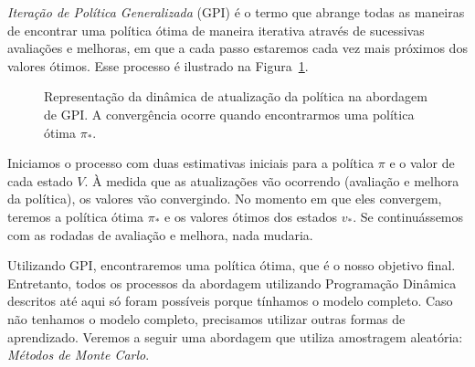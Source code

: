 \documentclass{article}
\begin{document}
        \emph{Iteração de Política Generalizada} (GPI) é o termo que abrange todas as maneiras de encontrar uma política ótima de maneira iterativa através de sucessivas avaliações e melhoras, em que a cada passo estaremos cada vez mais próximos dos valores ótimos. Esse processo é ilustrado na Figura~\ref{diag:generalized-policy-iteration}. 
        
        \vspace{5mm}
        \begin{figure}[ht]
            \centering
            \caption{Representação da dinâmica de atualização da política na abordagem de GPI. A convergência ocorre quando encontrarmos uma política ótima $\pi_*$.}
            \label{diag:generalized-policy-iteration}
        \end{figure}
        
        Iniciamos o processo com duas estimativas iniciais para a política $\pi$ e o valor de cada estado $V$. À medida que as atualizações vão ocorrendo (avaliação e melhora da política), os valores vão convergindo. No momento em que eles convergem, teremos a política ótima $\pi_*$ e os valores ótimos dos estados $v_*$. Se continuássemos com as rodadas de avaliação e melhora, nada mudaria.
        
        Utilizando GPI, encontraremos uma política ótima, que é o nosso objetivo final. Entretanto, todos os processos da abordagem utilizando Programação Dinâmica descritos até aqui só foram possíveis porque tínhamos o modelo completo. Caso não tenhamos o modelo completo, precisamos utilizar outras formas de aprendizado. Veremos a seguir uma abordagem que utiliza amostragem aleatória: \emph{Métodos de Monte Carlo}.
        
\end{document}
